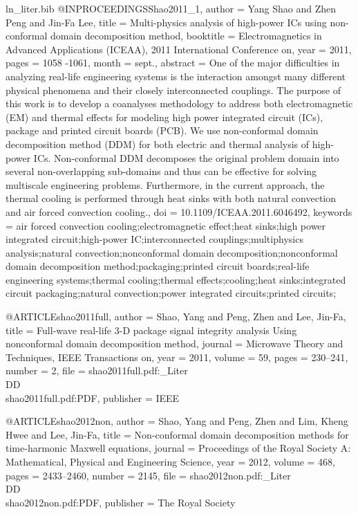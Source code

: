 \begin{filecontents*}{ln_liter.bib}
@INPROCEEDINGS{Shao2011_1,
  author = {Yang Shao and Zhen Peng and Jin-Fa Lee},
  title = {Multi-physics analysis of high-power ICs using non-conformal domain
	decomposition method},
  booktitle = {Electromagnetics in Advanced Applications (ICEAA), 2011 International
	Conference on},
  year = {2011},
  pages = {1058 -1061},
  month = {sept.},
  abstract = {One of the major difficulties in analyzing real-life engineering systems
	is the interaction amongst many different physical phenomena and
	their closely interconnected couplings. The purpose of this work
	is to develop a coanalyses methodology to address both electromagnetic
	(EM) and thermal effects for modeling high power integrated circuit
	(ICs), package and printed circuit boards (PCB). We use non-conformal
	domain decomposition method (DDM) for both electric and thermal analysis
	of high-power ICs. Non-conformal DDM decomposes the original problem
	domain into several non-overlapping sub-domains and thus can be effective
	for solving multiscale engineering problems. Furthermore, in the
	current approach, the thermal cooling is performed through heat sinks
	with both natural convection and air forced convection cooling.},
  doi = {10.1109/ICEAA.2011.6046492},
  keywords = {air forced convection cooling;electromagnetic effect;heat sinks;high
	power integrated circuit;high-power IC;interconnected couplings;multiphysics
	analysis;natural convection;nonconformal domain decomposition;nonconformal
	domain decomposition method;packaging;printed circuit boards;real-life
	engineering systems;thermal cooling;thermal effects;cooling;heat
	sinks;integrated circuit packaging;natural convection;power integrated
	circuits;printed circuits;}
}

@ARTICLE{shao2011full,
  author = {Shao, Yang and Peng, Zhen and Lee, Jin-Fa},
  title = {Full-wave real-life {3-D} package signal integrity analysis Using
	nonconformal domain decomposition method},
  journal = {Microwave Theory and Techniques, IEEE Transactions on},
  year = {2011},
  volume = {59},
  pages = {230--241},
  number = {2},
  file = {shao2011full.pdf:_Liter\\DD\\shao2011full.pdf:PDF},
  publisher = {IEEE}
}

@ARTICLE{shao2012non,
  author = {Shao, Yang and Peng, Zhen and Lim, Kheng Hwee and Lee, Jin-Fa},
  title = {Non-conformal domain decomposition methods for time-harmonic {M}axwell
	equations},
  journal = {Proceedings of the Royal Society A: Mathematical, Physical and Engineering
	Science},
  year = {2012},
  volume = {468},
  pages = {2433--2460},
  number = {2145},
  file = {shao2012non.pdf:_Liter\\DD\\shao2012non.pdf:PDF},
  publisher = {The Royal Society}
}


\end{filecontents*}
